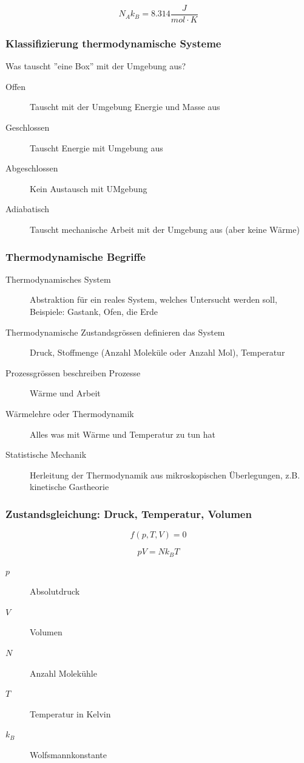 \documentclass[a4paper]{scrartcl}
\begin{document}
\[
	N_A k_B = 8.314 \frac{J}{mol \cdot K}
\]

\subsubsection{Klassifizierung thermodynamische Systeme}

Was tauscht ''eine Box'' mit der Umgebung aus?


\begin{description}
	\item[Offen] Tauscht mit der Umgebung Energie und Masse aus
	\item[Geschlossen] Tauscht Energie mit Umgebung aus
	\item[Abgeschlossen] Kein Austausch mit UMgebung
	\item[Adiabatisch] Tauscht mechanische Arbeit mit der Umgebung aus (aber keine Wärme)
\end{description}

\subsubsection{Thermodynamische Begriffe}

\begin{description}
	\item[Thermodynamisches System] Abstraktion für ein reales System, welches Untersucht werden soll, Beispiele: Gastank, Ofen, die Erde
	\item[Thermodynamische Zustandsgrössen definieren das System] Druck, Stoffmenge (Anzahl Moleküle oder Anzahl Mol), Temperatur
	\item[Prozessgrössen beschreiben Prozesse] Wärme und Arbeit
	\item[Wärmelehre oder Thermodynamik] Alles was mit Wärme und Temperatur zu tun hat
	\item[Statistische Mechanik] Herleitung der Thermodynamik aus mikroskopischen Überlegungen, z.B. kinetische Gastheorie
\end{description}


\subsubsection{Zustandsgleichung: Druck, Temperatur, Volumen}


\[
	f(p, T, V) = 0
\]



\[
p V = N k_B T
\]


\begin{description}
	\item[$p$] Absolutdruck
	\item[$V$] Volumen	
	\item[$N$] Anzahl Molekühle
	\item[$T$] Temperatur in Kelvin
	\item[$k_B$] Wolfsmannkonstante
\end{description}
\end{document}
